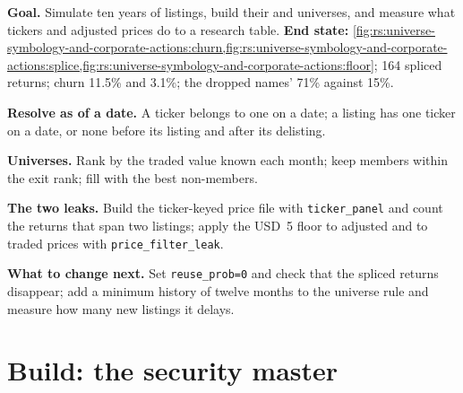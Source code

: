 \begin{tutorial}
\textbf{Goal.} Simulate ten years of listings, build their  and universes, and measure what tickers and adjusted
prices do to a research table. \textbf{End state:} \cref{fig:rs:universe-symbology-and-corporate-actions:churn,fig:rs:universe-symbology-and-corporate-actions:splice,fig:rs:universe-symbology-and-corporate-actions:floor};
164 spliced returns; churn 11.5\% and 3.1\%; the dropped names' 71\% against 15\%.
\begin{tutsteps}
\item \textbf{Resolve as of a date.} A ticker belongs to one  on a date; a listing has one ticker on a date,
or none before its listing and after its delisting.
\label{lst:rs:universe-symbology-and-corporate-actions:resolve}
\item \textbf{Universes.} Rank by the traded value known each month; keep members within the exit rank; fill with the best
non-members.
\label{lst:rs:universe-symbology-and-corporate-actions:buffer}
\item \textbf{The two leaks.} Build the ticker-keyed price file with \texttt{ticker\_panel} and count the returns that span two
listings; apply the USD~5 floor to adjusted and to traded prices with \texttt{price\_filter\_leak}.
\end{tutsteps}
\textbf{What to change next.} Set \texttt{reuse\_prob=0} and check that the spliced returns disappear; add a minimum history of
twelve months to the universe rule and measure how many new listings it delays.
\end{tutorial}

\section{Build: the security master}\label{bld:rs:universe-symbology-and-corporate-actions:secmaster}

